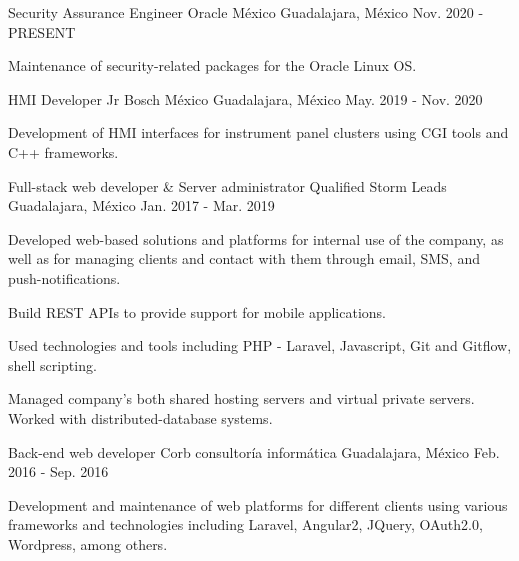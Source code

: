 \begin{cventries}
    \cventry
        {Security Assurance Engineer}
        {Oracle México}
        {Guadalajara, México}
        {Nov. 2020 - PRESENT}
        {
            \begin{cvitems}
                \item {Maintenance of security-related packages for the Oracle Linux OS.}
            \end{cvitems}
        }
    \cventry
        {HMI Developer Jr}
        {Bosch México}
        {Guadalajara, México}
        {May. 2019 - Nov. 2020}
        {
            \begin{cvitems}
                \item {Development of HMI interfaces for instrument panel clusters using CGI tools and C++ frameworks.}
            \end{cvitems}
        }
    \cventry
        {Full-stack web developer \& Server administrator}
        {Qualified Storm Leads}
        {Guadalajara, México}
        {Jan. 2017 - Mar. 2019}
        {
            \begin{cvitems}
                \item {Developed web-based solutions and platforms for internal use of the company, as well as for managing clients and contact with them through email, SMS, and push-notifications.}
                \item {Build REST APIs to provide support for mobile applications.}
                \item {Used technologies and tools including PHP - Laravel, Javascript, Git and Gitflow, shell scripting.}
                \item {Managed company's both shared hosting servers and virtual private servers. Worked with distributed-database systems.}
            \end{cvitems}
        }
    \cventry
        {Back-end web developer}
        {Corb consultoría informática}
        {Guadalajara, México}
        {Feb. 2016 - Sep. 2016}
        {
            \begin{cvitems}
                \item {Development and maintenance of web platforms for different clients using various frameworks and technologies including Laravel, Angular2, JQuery, OAuth2.0, Wordpress, among others.}
            \end{cvitems}
        }
\end{cventries}

